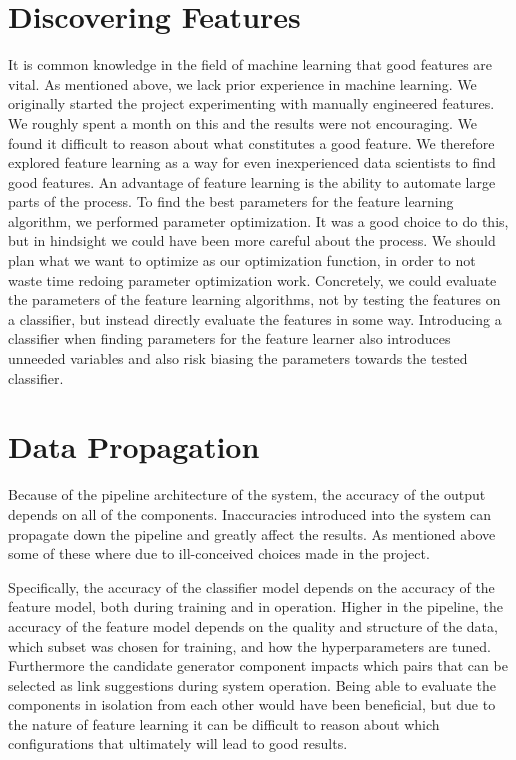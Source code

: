 \section{Discovering Features}
It is common knowledge in the field of machine learning that good features are vital. As mentioned above, we lack prior experience in machine learning. We originally started the project experimenting with manually engineered features. We roughly spent a month on this and the results were not encouraging. We found it difficult to reason about what constitutes a good feature. We therefore explored feature learning as a way for even inexperienced data scientists to find good features. An advantage of feature learning is the ability to automate large parts of the process. To find the best parameters for the feature learning algorithm, we performed parameter optimization. It was a good choice to do this, but in hindsight we could have been more careful about the process. We should plan what we want to optimize as our optimization function, in order to not waste time redoing parameter optimization work. Concretely, we could evaluate the parameters of the feature learning algorithms, not by testing the features on a classifier, but instead directly evaluate the features in some way. Introducing a classifier when finding parameters for the feature learner also introduces unneeded variables and also risk biasing the parameters towards the tested classifier.

\section{Data Propagation}
Because of the pipeline architecture of the system, the accuracy of the output depends on all of the components.
Inaccuracies introduced into the system can propagate down the pipeline and greatly affect the results. As mentioned above some of these where due to ill-conceived choices made in the project. 

Specifically, the accuracy of the classifier model depends on the accuracy of the feature model, both during training and in operation. Higher in the pipeline, the accuracy of the feature model depends on the quality and structure of the data, which subset was chosen for training, and how the hyperparameters are tuned. Furthermore the candidate generator component impacts which pairs that can be selected as link suggestions during system operation.
Being able to evaluate the components in isolation from each other would have been beneficial, but due to the nature of feature learning it can be difficult to reason about which configurations that ultimately will lead to good results.

